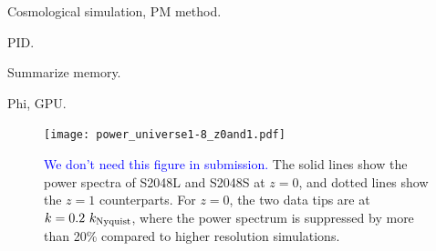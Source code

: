 \documentclass[10pt,twocolumn,preprint]{emulateapj}
\newcommand{\tcb}{\textcolor{blue}}
\begin{document}
 Cosmological simulation, PM method.

PID.

Summarize memory.

Phi, GPU.


\begin{figure}
\centering
  \texttt{[image: power\_universe1-8\_z0and1.pdf]}
 \caption{\tcb{We don't need this figure in submission.} The solid lines show the power spectra of S2048L and S2048S at $z=0$, and dotted lines show the $z=1$ counterparts. For $z=0$, the two data tips are at $k=0.2\ k_{\rm Nyquist}$, where the power spectrum is suppressed by more than 20\% compared to higher resolution simulations.}
\label{fig.power}
\end{figure}






\acknowledgements



\end{document}
